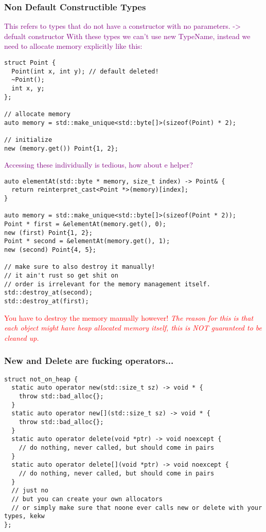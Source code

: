 \documentclass[main.tex,fontsize=8pt,paper=a4,paper=portrait,DIV=calc,]{scrartcl}
\begin{document}
\subsubsection{Non Default Constructible Types}
\textcolor{purple}{This refers to types that do not have a constructor with no parameters. -> defualt constructor\newline
With these types we can't use new TypeName, instead we need to allocate memory explicitly like this:}
\begin{lstlisting}
struct Point {
  Point(int x, int y); // default deleted!
  ~Point();
  int x, y;
};

// allocate memory
auto memory = std::make_unique<std::byte[]>(sizeof(Point) * 2);

// initialize
new (memory.get()) Point{1, 2};
\end{lstlisting}
\textcolor{purple}{Accessing these individually is tedious, how about e helper?}
\begin{lstlisting}
auto elementAt(std::byte * memory, size_t index) -> Point& {
  return reinterpret_cast<Point *>(memory)[index];
}

auto memory = std::make_unique<std::byte[]>(sizeof(Point * 2));
Point * first = &elementAt(memory.get(), 0);
new (first) Point{1, 2};
Point * second = &elementAt(memory.get(), 1);
new (second) Point{4, 5};

// make sure to also destroy it manually!
// it ain't rust so get shit on
// order is irrelevant for the memory management itself.
std::destroy_at(second);
std::destroy_at(first);
\end{lstlisting}
\textcolor{red}{You have to destroy the memory manually however!\newline
\emph{The reason for this is that each object might have heap allocated memory itself, this is NOT guaranteed to be cleaned up.}}

\subsubsection{New and Delete are fucking operators...}
\begin{lstlisting}
struct not_on_heap {
  static auto operator new(std::size_t sz) -> void * {
    throw std::bad_alloc{};
  }
  static auto operator new[](std::size_t sz) -> void * {
    throw std::bad_alloc{};
  }
  static auto operator delete(void *ptr) -> void noexcept {
    // do nothing, never called, but should come in pairs
  }
  static auto operator delete[](void *ptr) -> void noexcept {
    // do nothing, never called, but should come in pairs
  }
  // just no
  // but you can create your own allocators
  // or simply make sure that noone ever calls new or delete with your types, kekw
};
\end{lstlisting}
\end{document}
